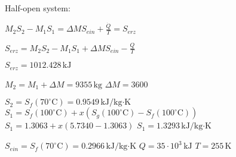 Half-open system:  

\( M_2 S_2 - M_1 S_1 = \Delta M S_{ein} + \frac{\dot{Q}}{T} = S_{erz} \)  

\( S_{erz} = M_2 S_2 - M_1 S_1 + \Delta M S_{ein} - \frac{Q}{T} \)  

\( S_{erz} = 1012.428 \, \text{kJ} \)  

\( M_2 = M_1 + \Delta M = 9355 \, \text{kg} \)  
\( \Delta M = 3600 \)  

\( S_2 = S_f(70^\circ \text{C}) = 0.9549 \, \text{kJ/kg·K} \)  
\( S_1 = S_f(100^\circ \text{C}) + x (S_g(100^\circ \text{C}) - S_f(100^\circ \text{C})) \)  
\( S_1 = 1.3063 + x (5.7340 - 1.3063) \)  
\( S_1 = 1.3293 \, \text{kJ/kg·K} \)  

\( S_{ein} = S_f(70^\circ \text{C}) = 0.2966 \, \text{kJ/kg·K} \)  
\( Q = 35 \cdot 10^3 \, \text{kJ} \)  
\( T = 255 \, \text{K} \)